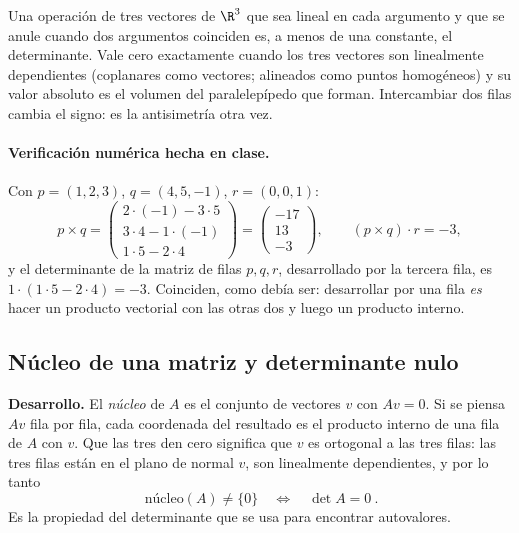 \begin{resultado}
Una operación de tres vectores de \(\R^3\) que sea lineal en cada argumento y que se anule
cuando dos argumentos coinciden es, a menos de una constante, el determinante. Vale cero
exactamente cuando los tres vectores son linealmente dependientes (coplanares como vectores;
alineados como puntos homogéneos) y su valor absoluto es el volumen del paralelepípedo que
forman. Intercambiar dos filas cambia el signo: es la antisimetría otra vez.
\end{resultado}

\paragraph{Verificación numérica hecha en clase.} Con \(p=(1,2,3)\), \(q=(4,5,-1)\),
\(r=(0,0,1)\):
\[
  p\times q=\begin{pmatrix}2\cdot(-1)-3\cdot5\\ 3\cdot4-1\cdot(-1)\\ 1\cdot5-2\cdot4\end{pmatrix}
  =\begin{pmatrix}-17\\13\\-3\end{pmatrix},\qquad
  (p\times q)\cdot r=-3,
\]
y el determinante de la matriz de filas \(p,q,r\), desarrollado por la tercera fila, es
\(1\cdot(1\cdot5-2\cdot4)=-3\). Coinciden, como debía ser: desarrollar por una fila
\emph{es} hacer un producto vectorial con las otras dos y luego un producto interno.

\subsection{Núcleo de una matriz y determinante nulo}\label{sec:nucleo}

{\small\vspace{1mm}\par}


\textbf{Desarrollo.} El \emph{núcleo} de \(A\) es el conjunto de vectores \(v\) con
\(Av=0\). Si se piensa \(Av\) fila por fila, cada coordenada del resultado es el producto
interno de una fila de \(A\) con \(v\). Que las tres den cero significa que \(v\) es
ortogonal a las tres filas: las tres filas están en el plano de normal \(v\), son linealmente
dependientes, y por lo tanto
\[
  \boxed{\ \text{núcleo}(A)\neq\{0\}\quad\Longleftrightarrow\quad\det A=0\ }.
\]
Es la propiedad del determinante que se usa para encontrar autovalores.

